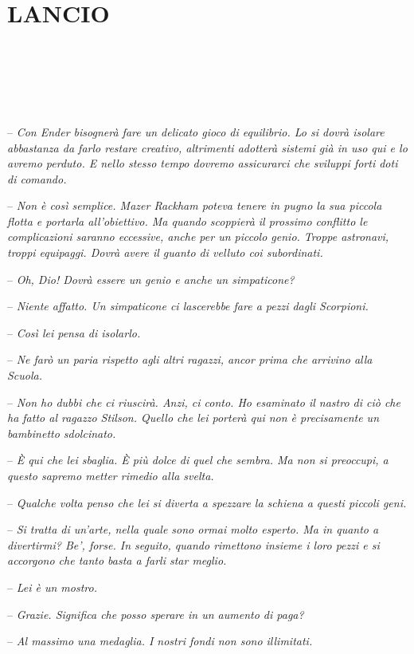 \chapter{LANCIO}

{~}

{~}

{~}

{-- \emph{Con Ender bisognerà fare un delicato gioco di equilibrio. Lo
		si dovrà isolare abbastanza da farlo restare creativo, altrimenti
		adotterà sistemi già in uso qui e lo avremo perduto. E nello stesso
		tempo dovremo assicurarci che sviluppi forti doti di comando.}}

{-- \emph{Non è così semplice. Mazer Rackham poteva tenere in pugno la
		sua piccola flotta e portarla all'obiettivo. Ma quando scoppierà il
		prossimo conflitto le complicazioni saranno eccessive, anche per un
		piccolo genio. Troppe astronavi, troppi equipaggi. Dovrà avere il guanto
		di velluto coi subordinati.}}

{-- \emph{Oh, Dio! Dovrà essere un genio e anche un simpaticone?}}

{-- \emph{Niente affatto. Un simpaticone ci lascerebbe fare a pezzi
		dagli Scorpioni.}}

{-- \emph{Così lei pensa di isolarlo.}}

{-- \emph{Ne farò un paria rispetto agli altri ragazzi, ancor prima che
		arrivino alla Scuola.}}

{-- \emph{Non ho dubbi che ci riuscirà. Anzi, ci conto. Ho esaminato il
		nastro di ciò che ha fatto al ragazzo Stilson. Quello che lei porterà
		qui non è precisamente un bambinetto sdolcinato.}}

{-- \emph{È qui che lei sbaglia. È più dolce di quel che sembra. Ma non
		si preoccupi, a questo sapremo metter rimedio alla svelta.}}

{-- \emph{Qualche volta penso che lei si diverta a spezzare la schiena a
		questi piccoli geni.}}

{-- \emph{Si tratta di un'arte, nella quale sono ormai molto esperto. Ma
		in quanto a divertirmi? Be', forse. In seguito, quando rimettono insieme
		i loro pezzi e si accorgono che tanto basta a farli star meglio.}}

{-- \emph{Lei è un mostro.}}

{-- \emph{Grazie. Significa che posso sperare in un aumento di paga?}}

{-- \emph{Al massimo una medaglia. I nostri fondi non sono illimitati.}}

{~}

